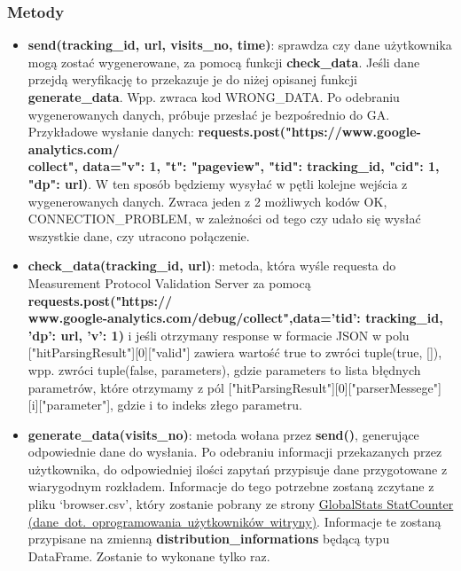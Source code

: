 \documentclass{article}
\begin{document}
\subsubsection{Metody}
\begin{itemize}
\item \textbf{send(tracking\_id, url, visits\_no, time)}: sprawdza czy dane użytkownika mogą zostać wygenerowane, za pomocą funkcji \textbf{check\_data}. Jeśli dane przejdą weryfikację to przekazuje je do niżej opisanej funkcji \textbf{generate\_data}. Wpp. zwraca kod WRONG\_DATA. Po odebraniu wygenerowanych danych, próbuje przesłać je bezpośrednio do GA\@. Przykładowe wysłanie danych: \textbf{requests.post("https://www.google-analytics.com/\\collect", data={"v":  1, "t": "pageview", "tid": tracking\_id, "cid": 1, "dp": url})}. W ten sposób będziemy wysyłać w pętli kolejne wejścia z wygenerowanych danych. Zwraca jeden z  2 możliwych kodów {OK, CONNECTION\_PROBLEM}, w zależności od tego czy udało się wysłać wszystkie dane, czy utracono połączenie.

\item \textbf{check\_data(tracking\_id, url)}: metoda, która wyśle requesta do Measurement Protocol Validation Server za pomocą \textbf{requests.post("https://\\www.google-analytics.com/debug/collect",data={'tid': tracking\_id, 'dp': url, 'v': 1})} i jeśli otrzymany response w formacie JSON w polu ["hitParsingResult"][0]["valid"] zawiera wartość true to zwróci tuple(true, []), wpp. zwróci tuple(false, parameters), gdzie parameters to lista błędnych parametrów, które otrzymamy z pól ["hitParsingResult"][0]["parserMessege"] [i]["parameter"], gdzie i to indeks złego parametru.

\item \textbf{generate\_data(visits\_no)}: metoda wołana przez \textbf{send()}, generujące odpowiednie dane do wysłania. Po odebraniu informacji przekazanych przez użytkownika, do odpowiedniej ilości zapytań przypisuje dane przygotowane z wiarygodnym rozkładem. Informacje do tego potrzebne zostaną zczytane z pliku `browser.csv', który zostanie pobrany ze strony \href{http://gs.statcounter.com/browser-version-market-share/all/poland#monthly-201703-201803-bar}{GlobalStats StatCounter (dane\ dot.\ oprogramowania\ użytkowników\ witryny)}. Informacje te zostaną przypisane na zmienną \textbf{distribution\_informations} będącą typu DataFrame. Zostanie to wykonane tylko raz.

\end{itemize}
\end{document}
